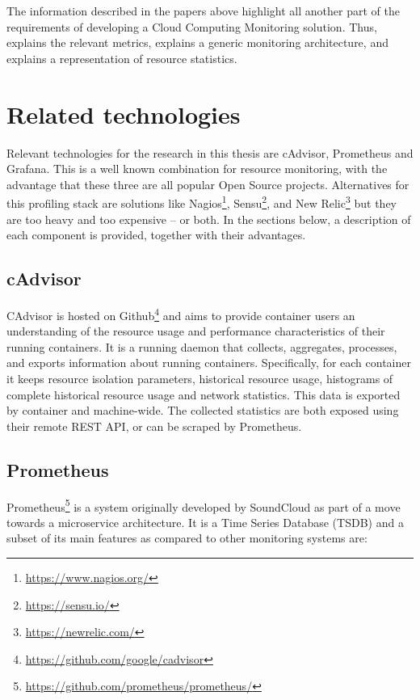 \noindent
The information described in the papers above highlight all another part of the requirements of developing a Cloud Computing Monitoring solution. Thus, \cite{wang2018self} explains the relevant metrics, \cite{aktas2018hybrid} explains a generic monitoring architecture, and \cite{hauser2018reviewing} explains a representation of resource statistics.

\section{Related technologies} \label{sc:related_technologies}
Relevant technologies for the research in this thesis are cAdvisor, Prometheus and Grafana. This is a well known combination for resource monitoring, with the advantage that these three are all popular Open Source projects. Alternatives for this profiling stack are solutions like Nagios\footnote{\url{https://www.nagios.org/}}, Sensu\footnote{\url{https://sensu.io/}}, and New Relic\footnote{\url{https://newrelic.com/}} but they are too heavy and too expensive – or both. In the sections below, a description of each component is provided, together with their advantages.

\subsection{cAdvisor}
CAdvisor is hosted on Github\footnote{\url{https://github.com/google/cadvisor}} and aims to provide container users an understanding of the resource usage and performance characteristics of their running containers. It is a running daemon that collects, aggregates, processes, and exports information about running containers. Specifically, for each container it keeps resource isolation parameters, historical resource usage, histograms of complete historical resource usage and network statistics. This data is exported by container and machine-wide. The collected statistics are both exposed using their remote REST API, or can be scraped by Prometheus.

\subsection{Prometheus} 
Prometheus\footnote{\url{https://github.com/prometheus/prometheus/}} is a system originally developed by SoundCloud as part of a move towards a microservice architecture. It is a Time Series Database (TSDB) and a subset of its main features as compared to other monitoring systems are: 

